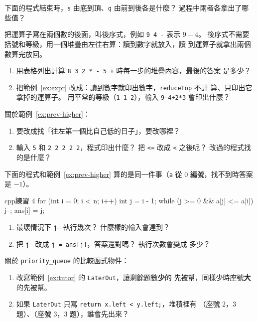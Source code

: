 \begin{drills}[label=drills:ch6]
\item 下面的程式結束時，\texttt{s} 由底到頂、\texttt{q} 由前到後各是什麼？
過程中兩者各拿出了哪些值？

\item 把運算子寫在兩個數的後面，叫後序式，例如 \texttt{9 4 -} 表示
$9 - 4$。 後序式不需要括號和等級，用一個堆疊由左往右算：讀到數字就放入，讀
到運算子就拿出兩個數算完放回。
\begin{enumerate}
\item 用表格列出計算 \texttt{8 3 2 * - 5 +} 時每一步的堆疊內容，最後的答案
是多少？
\item 把範例~\ref{ex:expr} 改成：讀到數字就印出數字，\texttt{reduceTop} 不計
算、只印出它拿掉的運算子。 用平常的等級（\texttt{1 1 2}），輸入
\texttt{9-4+2*3} 會印出什麼？
\end{enumerate}

\item 關於範例~\ref{ex:prev-higher}：
\begin{enumerate}
\item 要改成找「往左第一個比自己低的日子」，要改哪裡？
\item 輸入 \texttt{5} 和 \texttt{2 2 2 2 2}，程式印出什麼？ 把
\texttt{<=} 改成 \texttt{<} 之後呢？ 改過的程式找的是什麼？
\end{enumerate}

\item 下面的程式和範例~\ref{ex:prev-higher} 算的是同一件事（\texttt{a} 從
$0$ 編號，找不到時答案是 $-1$）。
\begin{code}{cpp}{練習 4}
for (int i = 0; i < n; i++) {
    int j = i - 1;
    while (j >= 0 && a[j] <= a[i]) {
        j--;
    }
    ans[i] = j;
}
\end{code}
\begin{enumerate}
\item 最壞情況下 \texttt{j--} 執行幾次？ 什麼樣的輸入會達到？
\item 把 \texttt{j--} 改成 \texttt{j = ans[j]}，答案還對嗎？ 執行次數會變成
多少？
\end{enumerate}

\item 關於 \texttt{priority\_queue} 的比較函式物件：
\begin{enumerate}
\item 改寫範例~\ref{ex:tutor} 的 \texttt{LaterOut}，讓剩餘題數\textbf{少}的
先被幫，同樣少時座號\textbf{大}的先被幫。
\item 如果 \texttt{LaterOut} 只寫 \texttt{return x.left < y.left;}，堆積裡有
（座號 2，3 題）、（座號 3，3 題），誰會先出來？
\end{enumerate}


\end{drills}
